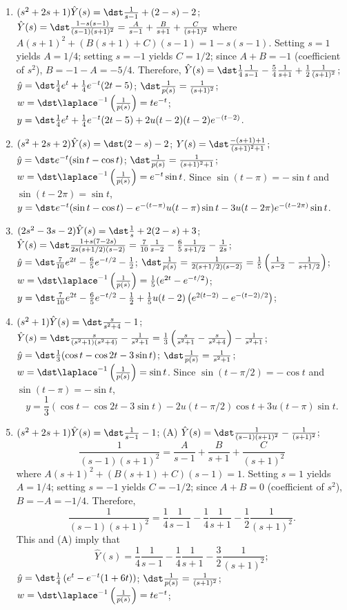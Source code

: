\documentclass[openany]{book}
\newenvironment{sectionSolutions}{
 \begin{enumerate}[item-label={\thesection.\arabic{enumi}.}]
}{
 \end{enumerate}
}
\begin{document}
\begin{sectionSolutions}
\item
 $(s^2+2s+1)\hat Y(s)=\dst\frac{1}{ s-1}+(2-s)-2$;
$\hat Y(s)=\dst\frac{1-s(s-1)}{(s-1)(s+1)^2}=
\frac{A}{ s-1}+\frac{B}{ s+1}+\frac{C}{(s+1)^2}$ where
$A(s+1)^2+(B(s+1)+C)(s-1)=1-s(s-1)$. Setting $s=1$
yields $A=1/4$; setting $s=-1$ yields $C=1/2$; since $A+B=-1$
(coefficient of $s^2$), $B=-1-A=-5/4$. Therefore,
$\hat Y(s)=\dst\frac{1}{4}\frac{1}{ s-1}-\frac{5}{4}\frac{1}{ s+1}+\frac{1}{2}
\frac{1}{(s+1)^2}$;
 $\hat y=\dst\frac{1}{4}e^t+\frac{1}{4}e^{-t}(2t-5)$;
$\dst\frac{1}{ p(s)}=\frac{1}{(s+1)^2}$;
$w=\dst\laplace ^{-1}\left(\frac{1}{ p(s)}\right)=te^{-t}$;
 $y=\dst\frac{1}{4}e^t+\frac{1}{4}e^{-t}(2t-5)+2u(t-2)(t-2)e^{-(t-2)}$.


\item
 $(s^2+2s+2)\hat Y(s)=\dst(2-s)-2$;
$Y(s)=\dst\frac{-(s+1)+1}{(s+1)^2+1}$;
$\hat y=\dst e^{-t}(\sin t-\cos t)$;
$\dst\frac{1}{ p(s)}=\frac{1}{(s+1)^2+1}$;
$w=\dst\laplace ^{-1}\left(\frac{1}{ p(s)}\right)=e^{-t}\sin t$.
Since $\sin(t-\pi)=-\sin t$ and $\sin(t-2\pi)=\sin t$,
$y=\dst e^{-t}(\sin t-\cos t)-e^{-(t-\pi)}u(t-\pi)\sin
t-3u(t-2\pi)e^{-(t-2\pi)}\sin t$.


\item
$(2s^2-3s-2)\hat Y(s)=\dst\frac{1}{ s}+2(2-s)+3$;
$\hat Y(s)=\dst\frac{1+s(7-2s)}{2s(s+1/2)(s-2)}=\frac{7}{10}\frac{1}{
s-2}-\frac{6}{5}\frac{1}{ s+1/2}-\frac{1}{2s}$;
$\hat y=\dst\frac{7}{10}e^{2t}-\frac{6}{5}e^{-t/2}-\frac{1}{2}$;
$\dst\frac{1}{
p(s)}=\frac{1}{2(s+1/2)(s-2)}=\frac{1}{5}\left(\frac{1}{
s-2}-\frac{1}{ s+1/2}\right)$;
$w=\dst\laplace ^{-1}\left(\frac{1}{
p(s)}\right)=\frac{1}{5}(e^{2t}-e^{-t/2})$;
$y=\dst\frac{7}{10}e^{2t}-\frac{6}{5}e^{-t/2}-\frac{1}{2}+\frac{1}{5}u(t-2)
\left(e^{2(t-2)}-e^{-(t-2)/2}\right)$;


\item
$(s^2+1)\hat Y(s)=\dst\frac{s}{ s^2+4}-1$;
$\hat Y(s)=\dst\frac{s}{(s^2+1)(s^2+4)}-\frac{1}{ s^2+1}
=\frac{1}{3}\left(\frac{s}{ s^2+1}-\frac{s}{ s^2+4}\right)-\frac{1}{ s^2+1}$;
$\hat y=\dst\frac{1}{3}(\cos t-\cos2t-3\sin t)$;
$\dst\frac{1}{ p(s)}=\frac{1}{ s^2+1}$;
$w=\dst\laplace ^{-1}\left(\frac{1}{ p(s)}\right)=\sin t$.
Since $\sin(t-\pi/2)=-\cos t$ and $\sin(t-\pi)=-\sin t$,
\[
y=\frac{1}{3}(\cos t-\cos2t-3\sin t)-2u(t-\pi/2)\cos t+3u(t-\pi)\sin
t.
\]


\item
$(s^2+2s+1)\hat Y(s)=\dst\frac{1}{ s-1}-1$;
(A) $\hat Y(s)=\dst\frac{1}{(s-1)(s+1)^2}-\frac{1}{(s+1)^2}$;
\[
\frac{1}{(s-1)(s+1)^2}=\frac{A}{ s-1}+\frac{B}{ s+1}+\frac{C}{(s+1)^2}
\]
where
$A(s+1)^2+(B(s+1)+C)(s-1)=1$. Setting $s=1$ yields $A=1/4$;
setting $s=-1$ yields $C=-1/2$; since $A+B=0$ (coefficient of $s^2$),
$B=-A=-1/4$. Therefore,
\[
\frac{1}{(s-1)(s+1)^2}=\frac{1}{4}\frac{1}{ s-1}-\frac{1}{4}\frac{1}{
s+1}-\frac{1}{2}\frac{1}{(s+1)^2}.
\]
This and (A) imply that
\[
\hat Y(s)=\frac{1}{4}\frac{1}{ s-1}-\frac{1}{4}\frac{1}{
s+1}-\frac{3}{2}\frac{1}{(s+1)^2};
\]
$\hat y=\dst\frac{1}{4}\left(e^t-e^{-t}(1+6t)\right)$;
$\dst\frac{1}{ p(s)}=\frac{1}{(s+1)^2}$;
$w=\dst\laplace ^{-1}\left(\frac{1}{ p(s)}\right)=te^{-t}$;


\end{sectionSolutions}
\end{document}
